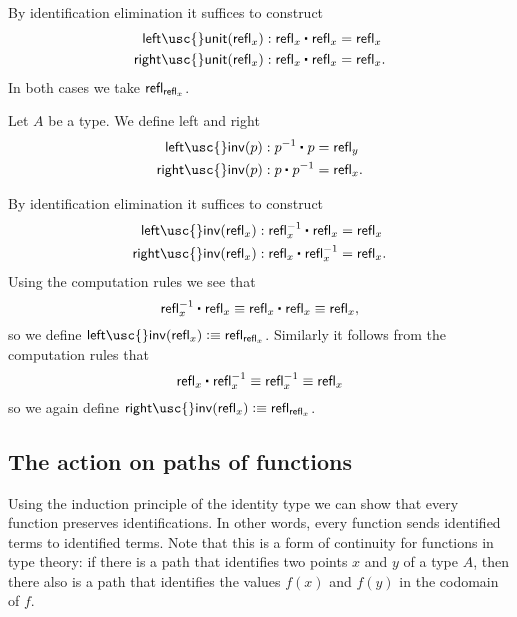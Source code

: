 \begin{constr}
By identification elimination it suffices to construct
\begin{align*}
\mathsf{left\usc{}unit}(\refl{x}) & : \ct{\refl{x}}{\refl{x}} = \refl{x} \\
\mathsf{right\usc{}unit}(\refl{x}) & : \ct{\refl{x}}{\refl{x}} = \refl{x}.
\end{align*}
In both cases we take $\mathsf{refl}_{\mathsf{refl}_{x}}$.
\end{constr}

\begin{defn}\label{defn:id_invlaw}
Let $A$ be a type. We define left and right 
\begin{align*}
\mathsf{left\usc{}inv}(p) & : \ct{p^{-1}}{p} = \refl{y} \\
\mathsf{right\usc{}inv}(p) & : \ct{p}{p^{-1}} = \refl{x}.
\end{align*}
\end{defn}

\begin{constr}
By identification elimination it suffices to construct
\begin{align*}
\mathsf{left\usc{}inv}(\refl{x}) & : \ct{\refl{x}^{-1}}{\refl{x}} = \refl{x} \\
\mathsf{right\usc{}inv}(\refl{x}) & : \ct{\refl{x}}{\refl{x}^{-1}} = \refl{x}.
\end{align*}
Using the computation rules we see that
\begin{equation*}
\ct{\refl{x}^{-1}}{\refl{x}}\jdeq \ct{\refl{x}}{\refl{x}}\jdeq\refl{x},
\end{equation*}
so we define $\mathsf{left\usc{}inv}(\refl{x})\defeq \refl{\refl{x}}$. Similarly it follows from the computation rules that
\begin{equation*}
\ct{\refl{x}}{\refl{x}^{-1}} \jdeq \refl{x}^{-1}\jdeq \refl{x}
\end{equation*}
so we again define $\mathsf{right\usc{}inv}(\refl{x})\defeq\refl{\refl{x}}$. 
\end{constr}

\subsection{The action on paths of functions}

Using the induction principle of the identity type we can show that every function preserves identifications.
In other words, every function sends identified terms to identified terms.
Note that this is a form of continuity for functions in type theory: if there is a path that identifies two points $x$ and $y$ of a type $A$, then there also is a path that identifies the values $f(x)$ and $f(y)$ in the codomain of $f$. 

